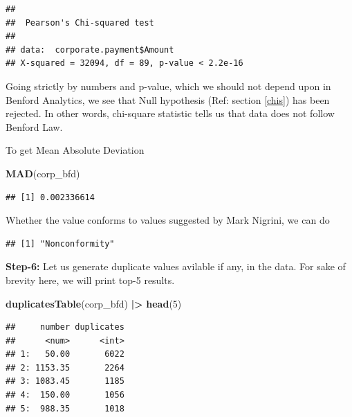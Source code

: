 \documentclass[
]{book}
\newenvironment{Shaded}{\begin{snugshade}}{\end{snugshade}}
\newcommand{\DecValTok}[1]{\textcolor[rgb]{0.00,0.00,0.81}{#1}}
\newcommand{\FunctionTok}[1]{\textcolor[rgb]{0.13,0.29,0.53}{\textbf{#1}}}
\newcommand{\NormalTok}[1]{#1}
\newcommand{\SpecialCharTok}[1]{\textcolor[rgb]{0.81,0.36,0.00}{\textbf{#1}}}
\begin{document}
\begin{verbatim}
## 
##  Pearson's Chi-squared test
## 
## data:  corporate.payment$Amount
## X-squared = 32094, df = 89, p-value < 2.2e-16
\end{verbatim}

Going strictly by numbers and p-value, which we should not depend upon in Benford Analytics, we see that Null hypothesis (Ref: section \ref{chis}) has been rejected. In other words, chi-square statistic tells us that data does not follow Benford Law.

To get Mean Absolute Deviation

\begin{Shaded}
\begin{Highlighting}[]
\FunctionTok{MAD}\NormalTok{(corp\_bfd)}
\end{Highlighting}
\end{Shaded}

\begin{verbatim}
## [1] 0.002336614
\end{verbatim}

Whether the value conforms to values suggested by Mark Nigrini, we can do

\begin{Shaded}
\end{Shaded}

\begin{verbatim}
## [1] "Nonconformity"
\end{verbatim}

\textbf{Step-6:} Let us generate duplicate values avilable if any, in the data. For sake of brevity here, we will print top-5 results.

\begin{Shaded}
\begin{Highlighting}[]
\FunctionTok{duplicatesTable}\NormalTok{(corp\_bfd) }\SpecialCharTok{|\textgreater{}} 
  \FunctionTok{head}\NormalTok{(}\DecValTok{5}\NormalTok{)}
\end{Highlighting}
\end{Shaded}

\begin{verbatim}
##     number duplicates
##      <num>      <int>
## 1:   50.00       6022
## 2: 1153.35       2264
## 3: 1083.45       1185
## 4:  150.00       1056
## 5:  988.35       1018
\end{verbatim}
\end{document}
